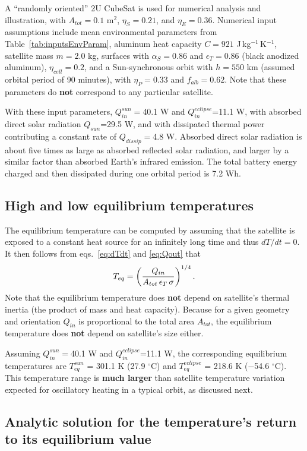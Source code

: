 \documentclass[]{aastex62}
\def\eq#1{\begin{equation} #1 \end{equation}}
\begin{document}
A ``randomly oriented'' 2U CubeSat is used for numerical analysis and illustration, with $A_{tot}=0.1$ m$^2$, $\eta_S=0.21$,
and $\eta_E=0.36$. Numerical input assumptions include mean environmental parameters from 
Table~\ref{tab:inputsEnvParam}, aluminum heat capacity $C=921$ J\,kg$^{-1}$\,K$^{-1}$, satellite 
mass $m=2.0$ kg, surfaces with $\alpha_S=0.86$ and $\epsilon_T=0.86$ (black anodized aluminum), 
$\eta_{cell}=0.2$,  and a Sun-synchronous orbit with $h=550$ km (assumed orbital period of 90 minutes), 
with $\eta_P=0.33$ and $f_{alb}=0.62$. Note that these parameters do {\bf not} correspond to any particular satellite.  

With these input parameters, $Q_{in}^{sun}=$40.1 W and $Q_{in}^{eclipse}$=11.1 W, with absorbed direct
solar radiation $Q_{sun}$=29.5 W, and with dissipated thermal power contributing a constant rate of
$Q_{dissip}=$4.8 W. Absorbed direct solar radiation is about five times as large as absorbed
reflected solar radiation, and larger by a similar factor than absorbed Earth's infrared emission. 
The total battery energy charged and then dissipated during one orbital period is 7.2 Wh. 


\subsection{High and low equilibrium temperatures} 

The equilibrium temperature can be computed by assuming that the satellite is exposed to a constant 
heat source for an infinitely long time and thus $dT/dt=0$. It then follows from eqs.~\ref{eq:dTdt} and 
\ref{eq:Qout} that
\eq{
\label{eq:Teq}
     T_{eq} = \left(  {Q_{in} \over A_{tot} \, \epsilon_T \, \sigma} \right)^{1/4}. 
}
Note that the equilibrium temperature does {\bf not} depend on satellite's thermal inertia (the product of 
mass and heat capacity).  Because for a given geometry and orientation $Q_{in}$ is proportional to the
total area $A_{tot}$, the equilibrium temperature does {\bf not} depend on satellite's size either. 

Assuming $Q_{in}^{sun}=$40.1 W and $Q_{in}^{eclipse}$=11.1 W, the corresponding equilibrium temperatures
are $T_{eq}^{sun}$ = 301.1 K  (27.9 $^\circ$C) and $T_{eq}^{eclipse}$ = 218.6 K  ($-$54.6 $^\circ$C).
This temperature range is {\bf much larger} than satellite temperature variation expected for oscillatory 
heating in a typical orbit, as discussed next. 


\subsection{Analytic solution for the temperature's return to its equilibrium value} 
\end{document}
